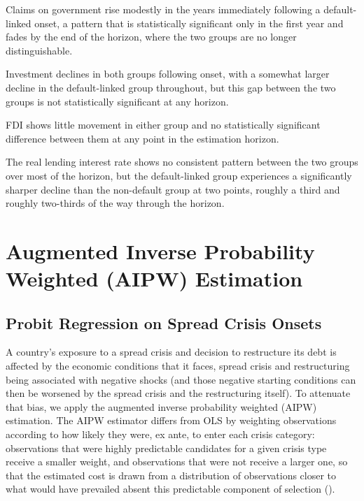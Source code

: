 \documentclass[12pt]{article}
\begin{document}
Claims on government rise modestly in the years immediately following a
default-linked onset, a pattern that is statistically significant only in
the first year and fades by the end of the horizon, where the two groups
are no longer distinguishable.

Investment declines in both groups following onset, with a somewhat
larger decline in the default-linked group throughout, but this gap
between the two groups is not statistically significant at any horizon.

FDI shows little movement in either group and no statistically
significant difference between them at any point in the estimation
horizon.

The real lending interest rate shows no consistent pattern between the two
groups over most of the horizon, but the default-linked group experiences
a significantly sharper decline than the non-default group at two points,
roughly a third and roughly two-thirds of the way through the horizon.

\section{Augmented Inverse Probability Weighted (AIPW) Estimation}

\subsection{Probit Regression on Spread Crisis Onsets}
\label{sec:probit-subsection}

A country's exposure to a spread crisis and decision to restructure its
debt is affected by the economic conditions that it faces, spread crisis
and restructuring being associated with negative shocks (and those
negative starting conditions can then be worsened by the spread crisis and
the restructuring itself). To attenuate that bias, we apply the augmented
inverse probability weighted (AIPW) estimation. The AIPW estimator differs
from OLS by weighting observations according to how likely they were, ex
ante, to enter each crisis category: observations that were highly
predictable candidates for a given crisis type receive a smaller weight,
and observations that were not receive a larger one, so that the
estimated cost is drawn from a distribution of observations closer to
what would have prevailed absent this predictable component of selection
(\citep{altonji2005selection}).
\end{document}

